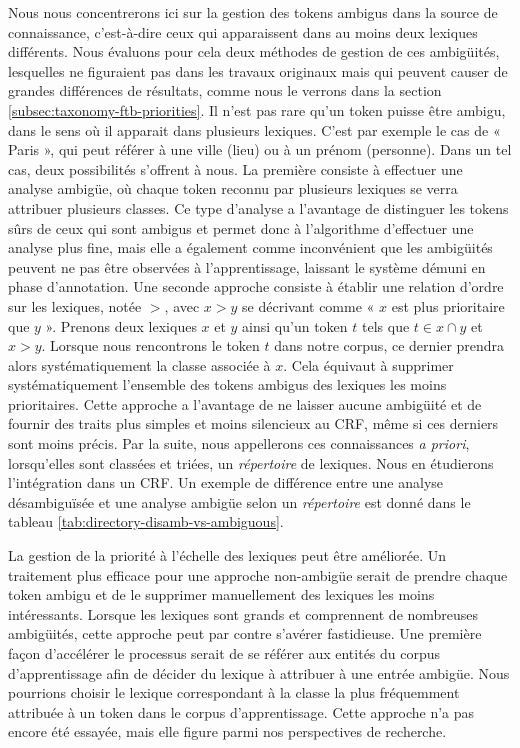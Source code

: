 \documentclass[12pt,a4paper,times,twoside,openright]{report}
\begin{document}
Nous nous concentrerons ici sur la gestion des tokens ambigus dans la source de connaissance, c'est-à-dire ceux qui apparaissent dans au moins deux lexiques différents. Nous évaluons pour cela deux méthodes de gestion de ces ambigüités, lesquelles ne figuraient pas dans les travaux originaux mais qui peuvent causer de grandes différences de résultats, comme nous le verrons dans la section \ref{subsec:taxonomy-ftb-priorities}. Il n'est pas rare qu'un token puisse être ambigu, dans le sens où il apparait dans plusieurs lexiques. C'est par exemple le cas de « Paris », qui peut référer à une ville (lieu) ou à un prénom (personne). Dans un tel cas, deux possibilités s'offrent à nous. La première consiste à effectuer une analyse ambigüe, où chaque token reconnu par plusieurs lexiques se verra attribuer plusieurs classes. Ce type d'analyse a l'avantage de distinguer les tokens sûrs de ceux qui sont ambigus et permet donc à l'algorithme d'effectuer une analyse plus fine, mais elle a également comme inconvénient que les ambigüités peuvent ne pas être observées à l'apprentissage, laissant le système démuni en phase d'annotation. Une seconde approche consiste à établir une relation d'ordre sur les lexiques, notée $>$, avec $x > y$ se décrivant comme « $x$ est plus prioritaire que $y$ ». Prenons deux lexiques $x$ et $y$ ainsi qu'un token $t$ tels que $t \in x \cap y$ et $x > y$. Lorsque nous rencontrons le token $t$ dans notre corpus, ce dernier prendra alors systématiquement la classe associée à $x$. Cela équivaut à supprimer systématiquement l'ensemble des tokens ambigus des lexiques les moins prioritaires. Cette approche a l'avantage de ne laisser aucune ambigüité et de fournir des traits plus simples et moins silencieux au CRF, même si ces derniers sont moins précis. Par la suite, nous appellerons ces connaissances \emph{a priori}, lorsqu'elles sont classées et triées, un \emph{répertoire} de lexiques. Nous en étudierons l'intégration dans un CRF. Un exemple de différence entre une analyse désambiguïsée et une analyse ambigüe selon un \emph{répertoire} est donné dans le tableau \ref{tab:directory-disamb-vs-ambiguous}.

La gestion de la priorité à l'échelle des lexiques peut être améliorée. Un traitement plus efficace pour une approche non-ambigüe serait de prendre chaque token ambigu et de le supprimer manuellement des lexiques les moins intéressants. Lorsque les lexiques sont grands et comprennent de nombreuses ambigüités, cette approche peut par contre s'avérer fastidieuse. Une première façon d'accélérer le processus serait de se référer aux entités du corpus d'apprentissage afin de décider du lexique à attribuer à une entrée ambigüe. Nous pourrions choisir le lexique correspondant à la classe la plus fréquemment attribuée à un token dans le corpus d'apprentissage. Cette approche n'a pas encore été essayée, mais elle figure parmi nos perspectives de recherche.
\end{document}
